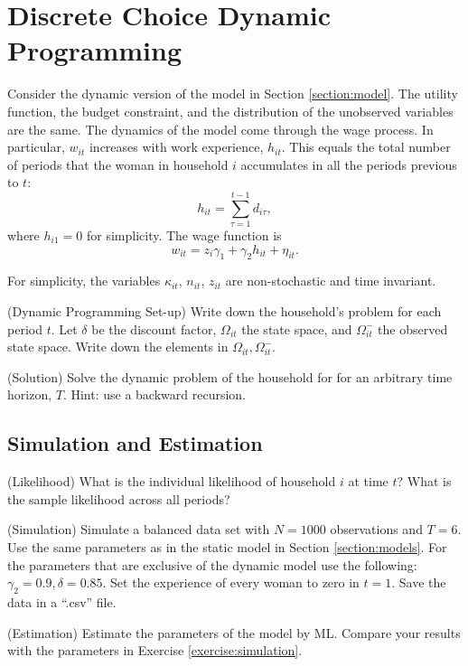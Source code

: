 \section{Discrete Choice Dynamic Programming}
Consider the dynamic version of the model in Section \ref{section:model}. The utility function, the budget constraint, and the distribution of the unobserved variables are the same. The dynamics of the model come through the wage process. In particular, $w_{it}$ increases with work experience, $h_{it}$. This equals the total number of periods that the woman in household $i$ accumulates in all the periods previous to $t$:
\begin{equation}
h_{it} = \sum\limits_{\tau=1}^{t-1} d_{i\tau},
\end{equation} 
\noindent where $h_{i1} = 0$ for simplicity. The wage function is
\begin{equation}
w_{it} = z_{i}\gamma_{1} + \gamma_{2}h_{it} + \eta_{it}.
\end{equation} 

\noindent For simplicity, the variables $\kappa_{it}$, $n_{it}$, $z_{it}$ are non-stochastic and time invariant.

\begin{exercise} (Dynamic Programming Set-up)
Write down the household's problem for each period $t$. Let $\delta$ be the discount factor, $\Omega_{it}$ the state space, and $\Omega_{it}^-$ the observed state space. Write down the elements in $\Omega_{it},\Omega_{it}^-$.
\end{exercise}

\begin{exercise} (Solution)
Solve the dynamic problem of the household for for an arbitrary time horizon, $T$. Hint: use a backward recursion.
\end{exercise}

\subsection{Simulation and Estimation}

\begin{exercise} (Likelihood)
What is the individual likelihood of household $i$ at time $t$? What is the sample likelihood across all periods?
\end{exercise}

\begin{exercise} (Simulation) \label{exercise:simulation}
Simulate a balanced data set with $N = 1000$ observations and $T=6$. Use the same parameters as in the static model in Section \ref{section:models}. For the parameters that are exclusive of the dynamic model use the following: $\gamma_2 = 0.9,\delta = 0.85$. Set the experience of every woman to zero in $t=1$. Save the data in a ``.csv'' file.
\end{exercise}

\begin{exercise} (Estimation)
Estimate the parameters of the model by ML. Compare your results with the parameters in Exercise \ref{exercise:simulation}.
\end{exercise}